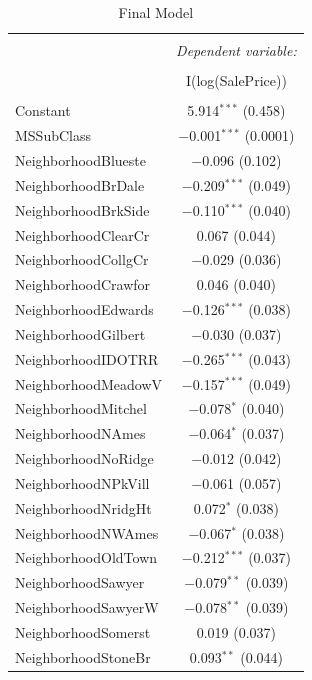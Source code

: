 \documentclass[]{article}
\begin{document}
\begin{table}[!htbp] \centering 
  \caption{Final Model} 
  \label{} 
\footnotesize 
\begin{tabular}{@{\extracolsep{5pt}}lc} 
\\[-1.8ex]\hline 
\hline \\[-1.8ex] 
 & \multicolumn{1}{c}{\textit{Dependent variable:}} \\ 
\cline{2-2} 
\\[-1.8ex] & I(log(SalePrice)) \\ 
\hline \\[-1.8ex] 
 Constant & 5.914$^{***}$ (0.458) \\ 
  MSSubClass & $-$0.001$^{***}$ (0.0001) \\ 
  NeighborhoodBlueste & $-$0.096 (0.102) \\ 
  NeighborhoodBrDale & $-$0.209$^{***}$ (0.049) \\ 
  NeighborhoodBrkSide & $-$0.110$^{***}$ (0.040) \\ 
  NeighborhoodClearCr & 0.067 (0.044) \\ 
  NeighborhoodCollgCr & $-$0.029 (0.036) \\ 
  NeighborhoodCrawfor & 0.046 (0.040) \\ 
  NeighborhoodEdwards & $-$0.126$^{***}$ (0.038) \\ 
  NeighborhoodGilbert & $-$0.030 (0.037) \\ 
  NeighborhoodIDOTRR & $-$0.265$^{***}$ (0.043) \\ 
  NeighborhoodMeadowV & $-$0.157$^{***}$ (0.049) \\ 
  NeighborhoodMitchel & $-$0.078$^{*}$ (0.040) \\ 
  NeighborhoodNAmes & $-$0.064$^{*}$ (0.037) \\ 
  NeighborhoodNoRidge & $-$0.012 (0.042) \\ 
  NeighborhoodNPkVill & $-$0.061 (0.057) \\ 
  NeighborhoodNridgHt & 0.072$^{*}$ (0.038) \\ 
  NeighborhoodNWAmes & $-$0.067$^{*}$ (0.038) \\ 
  NeighborhoodOldTown & $-$0.212$^{***}$ (0.037) \\ 
  NeighborhoodSawyer & $-$0.079$^{**}$ (0.039) \\ 
  NeighborhoodSawyerW & $-$0.078$^{**}$ (0.039) \\ 
  NeighborhoodSomerst & 0.019 (0.037) \\ 
  NeighborhoodStoneBr & 0.093$^{**}$ (0.044) \\ 

\end{tabular}
\end{table}
\end{document}
